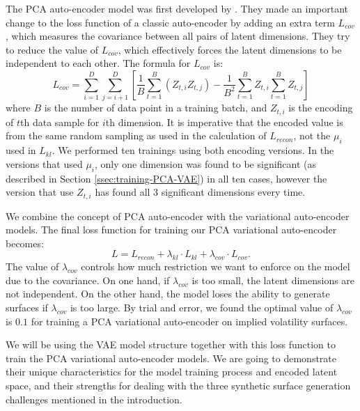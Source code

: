 \documentclass[format=sigconf]{acmart}
\begin{document}
The PCA auto-encoder model was first developed by %
\cite{ladjal2019pca}. They made an important change to the loss function of a classic auto-encoder by adding an extra term $L_{cov}$, which measures the covariance between all pairs of latent dimensions. They try to reduce the value of $L_{cov}$, which effectively forces the latent dimensions to be independent to each other. The formula for $L_{cov}$ is: 
\begin{equation} 
\label{eq:lcov}
L_{cov} = \sum_{i=1}^{D}\sum_{j=i+1}^{D} \left[ \frac{1}{B}\sum_{t=1}^{B}(Z_{t,i}Z_{t,j}) - \frac{1}{B^2}\sum_{t=1}^{B}Z_{t,i}\sum_{t=1}^{B}Z_{t,j}\right]
\end{equation}
where $B$ is the number of data point in a training batch, and $Z_{t,i}$ is the encoding of $t$th data sample for $i$th dimension. It is imperative that the encoded value is from the same random sampling as used in the calculation of $L_{recon}$, not the $\mu_{i}$ used in $L_{kl}$. We performed ten trainings using both encoding versions. In the versions that used $\mu_{i}$, only one dimension was found to be significant (as described in Section \ref{ssec:training-PCA-VAE}) in all ten cases, however the version that use $Z_{t,i}$ has found all 3 significant dimensions every time.

We combine the concept of PCA auto-encoder with the variational auto-encoder models. The final loss function for training our PCA variational auto-encoder becomes:
\begin{equation} 
\label{eq:pca}
L = L_{recon} + \lambda_{kl} \cdot L_{kl} + \lambda_{cov} \cdot L_{cov}.
\end{equation}
The value of $\lambda_{cov}$ controls how much restriction we want to enforce on the model due to the covariance. On one hand, if $\lambda_{cov}$ is too small, the latent dimensions are not independent. On the other hand, the model loses the ability to generate surfaces if $\lambda_{cov}$ is too large. By trial and error, we found the optimal value of $\lambda_{cov}$ is $0.1$ for training a PCA variational auto-encoder on implied volatility surfaces.

We will be using the VAE model structure together with this loss function to train the PCA variational auto-encoder models. We are going to demonstrate their unique characteristics for the model training process and encoded latent space, and their strengths for dealing with the three synthetic surface generation challenges mentioned in the introduction. 
\end{document}
